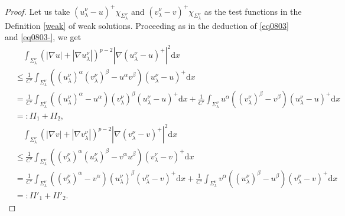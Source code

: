 \documentclass[12pt]{amsart}
\theoremstyle{definition}
\theoremstyle{remark}
\theoremstyle{conclusion}
\theoremstyle{conjecture}
\numberwithin{equation}{section}
\begin{document}
\begin{proof}




Let us take $(u^{\nu}_{\lambda}-u)^+\chi_{\Sigma^{\nu}_\lambda}$ and $(v^{\nu}_{\lambda}-v)^+\chi_{\Sigma^{\nu}_\lambda}$ as the test functions in the Definition \ref{weak} of weak solutions. Proceeding as in the deduction of \eqref{eq0803} and \eqref{eq0803-}, we get
\begin{align}\label{eq1004}
&\quad \int_{\Sigma_\lambda^\nu} (|\nabla u|+|\nabla u^{\nu}_{\lambda}|)^{p-2} |\nabla(u^{\nu}_{\lambda}-u)^+|^2 \mathrm{d}x \\
&\leq \frac{1}{C'} \int_{\Sigma_\lambda^\nu} ( (u^\nu_\lambda)^\alpha (v^\nu_\lambda)^\beta-u^\alpha v^\beta)(u^{\nu}_{\lambda} - u)^+  \mathrm{d}x  \nonumber\\
&= \frac{1}{C'}\int_{\Sigma^\nu_\lambda} ((u^\nu_{\lambda})^\alpha-u^\alpha)(v^\nu_{\lambda})^\beta (u^\nu_{\lambda}-u)^+ \mathrm{d}x + \frac{1}{C'}\int_{\Sigma^\nu_\lambda}u^\alpha((v^\nu_{\lambda})^\beta -v^{\beta}) (u^\nu_{\lambda}-u)^+ \mathrm{d}x  \nonumber \\
&=:II_1 + II_2, \nonumber
\end{align}
\begin{align}\label{eq1004'}
&\quad \int_{\Sigma_\lambda^\nu} (|\nabla v|+|\nabla v^{\nu}_{\lambda}|)^{p-2} |\nabla(v^{\nu}_{\lambda}-v)^+|^2 \mathrm{d}x \\
&\leq \frac{1}{C'} \int_{\Sigma_\lambda^\nu} ( (v^\nu_\lambda)^\alpha (u^\nu_\lambda)^\beta-v^\alpha u^\beta)(v^{\nu}_{\lambda} - v)^+  \mathrm{d}x  \nonumber\\
&= \frac{1}{C'}\int_{\Sigma^\nu_\lambda} ((v^\nu_{\lambda})^\alpha-v^\alpha)(u^\nu_{\lambda})^\beta (v^\nu_{\lambda}-v)^+ \mathrm{d}x + \frac{1}{C'}\int_{\Sigma^\nu_\lambda}v^\alpha((u^\nu_{\lambda})^\beta -u^{\beta}) (v^\nu_{\lambda}-v)^+ \mathrm{d}x  \nonumber \\
&=:II'_1 + II'_2. \nonumber
\end{align}


\end{proof}
\end{document}
